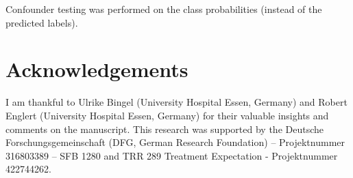 \documentclass{article}
\begin{document}
Confounder testing was performed on the class probabilities (instead of the predicted labels).


\section{Acknowledgements}
I am thankful to Ulrike Bingel (University Hospital Essen, Germany) and Robert Englert (University Hospital Essen, Germany) for their valuable insights and comments on the manuscript. This research was supported by the Deutsche Forschungsgemeinschaft (DFG, German Research Foundation) – Projektnummer 316803389 – SFB 1280  and TRR 289 Treatment Expectation - Projektnummer 422744262.




\newpage

\end{document}
